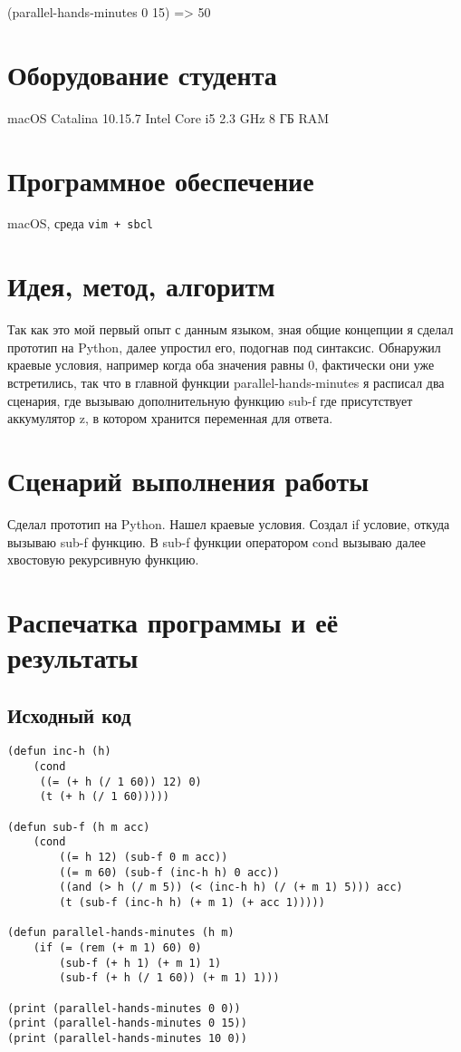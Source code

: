\documentclass[15pt]{extarticle}
\begin{document}
(parallel-hands-minutes 0 15) => 50

\section{Оборудование студента}
macOS Catalina 10.15.7 Intel Core i5 2.3 GHz 8 ГБ RAM

\section{Программное обеспечение}
macOS, среда {\tt vim + sbcl}

\section{Идея, метод, алгоритм}
Так как это мой первый опыт с данным языком, зная общие концепции я сделал прототип на Python, далее упростил его, подогнав под синтаксис. Обнаружил краевые условия, например когда оба значения равны 0, фактически они уже встретились, так что в главной функции parallel-hands-minutes я расписал два сценария, где вызываю дополнительную функцию sub-f где присутствует аккумулятор z, в котором хранится переменная для ответа.

\section{Сценарий выполнения работы}
Сделал прототип на Python. Нашел краевые условия. Создал if условие, откуда вызываю sub-f функцию. В sub-f функции оператором cond вызываю далее хвостовую рекурсивную функцию.

\section{Распечатка программы и её результаты}

\subsection{Исходный код}

\begin{lstlisting}
(defun inc-h (h) 
    (cond
     ((= (+ h (/ 1 60)) 12) 0)
     (t (+ h (/ 1 60)))))

(defun sub-f (h m acc)
    (cond
        ((= h 12) (sub-f 0 m acc))
        ((= m 60) (sub-f (inc-h h) 0 acc))
        ((and (> h (/ m 5)) (< (inc-h h) (/ (+ m 1) 5))) acc)
        (t (sub-f (inc-h h) (+ m 1) (+ acc 1)))))

(defun parallel-hands-minutes (h m)  
    (if (= (rem (+ m 1) 60) 0)  
        (sub-f (+ h 1) (+ m 1) 1)  
        (sub-f (+ h (/ 1 60)) (+ m 1) 1)))

(print (parallel-hands-minutes 0 0)) 
(print (parallel-hands-minutes 0 15))
(print (parallel-hands-minutes 10 0)) 
\end{lstlisting}
\end{document}
